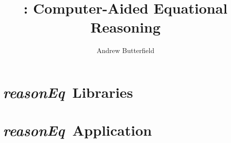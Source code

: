 \documentclass[fleqn,10pt]{report}
\author{Andrew Butterfield}
\title{\reasonEq: Computer-Aided Equational Reasoning }
\def\reasonEq{\textit{\textsf{reasonEq}}}
\begin{document}
\maketitle
\tableofcontents

\chapter{\reasonEq\ Libraries}

\newpage


\chapter{\reasonEq\ Application}

\newpage




\end{document}
